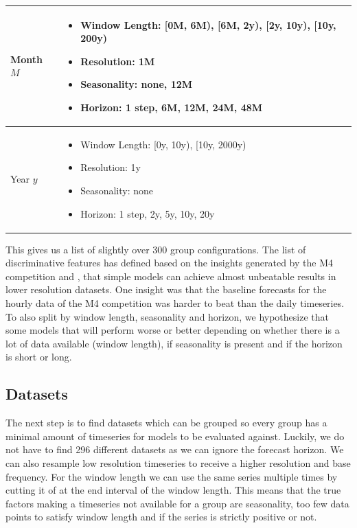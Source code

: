 \begin{table}
\begin{tabular}{p{3cm}|p{11.2cm}}
     \vspace{.01cm}
     Month $M$ & 
     \vspace{-.5cm}
     \begin{itemize}
         \setlength\itemsep{0cm}
         \item Window Length: [0M, 6M), [6M, 2y), [2y, 10y), [10y, 200y)
         \item Resolution: 1M
         \item Seasonality: none, 12M
         \item Horizon: 1 step, 6M, 12M, 24M, 48M
     \end{itemize}  \\
     \hline
     
     \vspace{.01cm}
     Year $y$ & 
     \vspace{-.5cm}
     \begin{itemize}
         \setlength\itemsep{0cm}
         \item Window Length: [0y, 10y), [10y, 2000y)
         \item Resolution: 1y
         \item Seasonality: none
         \item Horizon: 1 step, 2y, 5y, 10y, 20y
     \end{itemize}  \\
     \hline
  \end{tabular}
  \label{tab:groupConfigs}
\end{table}


This gives us a list of slightly over 300 group configurations. The list of discriminative features has defined based on the insights generated by the M4 competition \cite{M4} and \cite{sktime}, that simple models can achieve almost unbeatable results in lower resolution datasets. One insight was that the baseline forecasts for the hourly data of the M4 competition was harder to beat than the daily timeseries. To also split by window length, seasonality and horizon, we hypothesize that some models that will perform worse or better depending on whether there is a lot of data available (window length), if seasonality is present and if the horizon is short or long.

\subsection{Datasets}

The next step is to find datasets which can be grouped so every group has a minimal amount of timeseries for models to be evaluated against. Luckily, we do not have to find 296 different datasets as we can ignore the forecast horizon. We can also resample low resolution timeseries to receive a higher resolution and base frequency. For the window length we can use the same series multiple times by cutting it of at the end interval of the window length. This means that the true factors making a timeseries not available for a group are seasonality, too few data points to satisfy window length and if the series is strictly positive or not.

